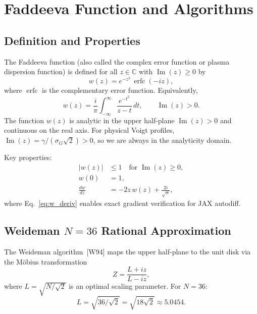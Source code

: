 \documentclass[11pt]{article}
\newcommand{\wfn}{w}  %
\newcommand{\im}{\operatorname{Im}}
\newcommand{\erfc}{\operatorname{erfc}}
\begin{document}
\section{Faddeeva Function and Algorithms}
\label{sec:faddeeva}

\subsection{Definition and Properties}

The Faddeeva function (also called the complex error function or plasma dispersion
function) is defined for all $z \in \mathbb{C}$ with $\im(z) \geq 0$ by
\begin{equation}
  \wfn(z) = e^{-z^2}\,\erfc(-iz),
  \label{eq:faddeeva_def}
\end{equation}
where $\erfc$ is the complementary error function. Equivalently,
\begin{equation}
  \wfn(z) = \frac{i}{\pi}\int_{-\infty}^{\infty} \frac{e^{-t^2}}{z - t}\,dt,
  \qquad \im(z) > 0.
  \label{eq:faddeeva_integral}
\end{equation}
The function $\wfn(z)$ is analytic in the upper half-plane $\im(z) > 0$ and continuous
on the real axis. For physical Voigt profiles, $\im(z) = \gamma/(\sigma_G\sqrt{2}) > 0$,
so we are always in the analyticity domain.

Key properties:
\begin{align}
  |\wfn(z)| &\leq 1 \quad \text{for } \im(z) \geq 0, \label{eq:w_bound} \\
  \wfn(0)   &= 1, \label{eq:w_zero} \\
  \frac{d\wfn}{dz} &= -2z\,\wfn(z) + \frac{2i}{\sqrt{\pi}}, \label{eq:w_deriv}
\end{align}
where Eq.~\eqref{eq:w_deriv} enables exact gradient verification for JAX autodiff.


\subsection{Weideman $N=36$ Rational Approximation}
\label{sec:weideman}

The Weideman algorithm~[W94] maps the upper half-plane to the unit disk via the
M\"obius transformation
\begin{equation}
  Z = \frac{L + iz}{L - iz},
  \label{eq:moebius}
\end{equation}
where $L = \sqrt{N/\sqrt{2}}$ is an optimal scaling parameter. For $N = 36$:
\begin{equation}
  L = \sqrt{36/\sqrt{2}} = \sqrt{18\sqrt{2}} \approx 5.0454.
  \label{eq:L_value}
\end{equation}
\end{document}
